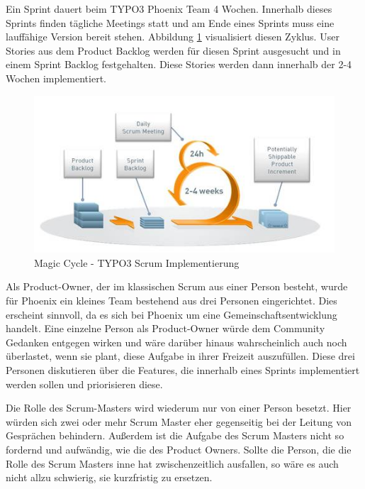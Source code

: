 Ein Sprint dauert beim TYPO3 Phoenix Team 4 Wochen. Innerhalb dieses Sprints finden tägliche Meetings statt und am Ende eines Sprints muss eine lauffähige Version bereit stehen. Abbildung \ref{magic-cycle} visualisiert diesen Zyklus. User Stories aus dem Product Backlog werden für diesen Sprint ausgesucht und in einem Sprint Backlog festgehalten. Diese Stories werden dann innerhalb der 2-4 Wochen implementiert.
\begin{figure}[h]
	\centering
	\includegraphics[width=1\textwidth]{images/typo3-magic-cycle.jpg}
	\caption{Magic Cycle - TYPO3 Scrum Implementierung \cite{bib:agiler-phoenix}}
	\label{magic-cycle}
\end{figure}

Als Product-Owner, der im klassischen Scrum aus einer Person besteht, wurde für Phoenix  ein kleines Team bestehend aus drei Personen eingerichtet. Dies erscheint sinnvoll, da es sich bei Phoenix um eine Gemeinschaftsentwicklung handelt. Eine einzelne Person als Product-Owner würde dem Community Gedanken entgegen wirken und  wäre darüber hinaus wahrscheinlich auch noch überlastet, wenn sie plant, diese Aufgabe in ihrer Freizeit auszufüllen. Diese drei Personen diskutieren über die Features, die innerhalb eines Sprints implementiert werden sollen und priorisieren diese. \cite{bib:forge}

Die Rolle des Scrum-Masters wird wiederum nur von einer Person besetzt. Hier würden sich zwei oder mehr Scrum Master eher gegenseitig bei der Leitung von Gesprächen behindern. Außerdem ist die Aufgabe des Scrum Masters nicht so fordernd und aufwändig, wie die des Product Owners. Sollte die Person, die die Rolle des Scrum Masters inne hat zwischenzeitlich ausfallen, so wäre es auch nicht allzu schwierig, sie kurzfristig zu ersetzen. \cite{bib:forge}

